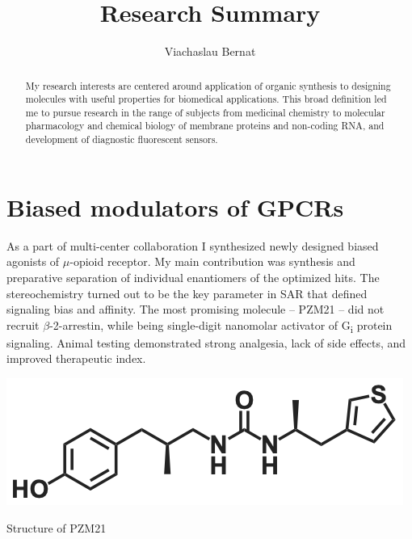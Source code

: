 \documentclass{tufte-handout}
\title{Research Summary}
\author[Viachaslau Bernat]{Viachaslau Bernat}
\begin{document}
\maketitle%

\begin{abstract}
\begin{fullwidth}
\noindent
My research interests are centered around application of organic synthesis to designing molecules with useful properties for biomedical applications. This broad definition led me to pursue research in the range of subjects from medicinal chemistry to molecular pharmacology and chemical biology of membrane proteins and non-coding RNA, and development of diagnostic fluorescent sensors. 
\end{fullwidth}
\end{abstract}

\section{Biased modulators of GPCRs}\label{sec:bias-gpcr}
\vspace{-0.5cm}

 As a part of multi-center 
collaboration I synthesized newly designed biased agonists of $\mu$-opioid receptor. My main contribution 
was synthesis and preparative separation of individual enantiomers of the optimized hits. The stereochemistry 
turned out to be the key parameter in SAR that defined signaling bias and affinity. The most 
promising molecule -- PZM21 -- did not recruit $\beta$-2-arrestin, while being single-digit nanomolar
activator of G\textsubscript{i} protein signaling. Animal testing demonstrated strong analgesia, lack of side effects, and improved 
therapeutic index\cite[-1.5cm]{Manglik2016}.
\begin{marginfigure}[-7.5cm]
	\includegraphics{PZM21.png}
	\caption{Structure of PZM21}
\end{marginfigure}
\end{document}
